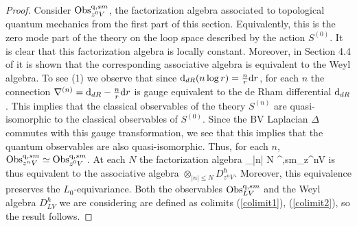 \documentclass[10pt]{amsart}
\begin{document}
\begin{proof}
Consider ${\rm Obs}_{z^0V}^{{\rm q}, sm}$, the factorization algebra associated to topological quantum mechanics from the first part of this section.
Equivalently, this is the zero mode part of the theory on the loop space described by the action $S^{(0)}$.
It is clear that this factorization algebra is locally constant. 
Moreover, in Section 4.4 of \cite{fact1} it is shown that the corresponding associative algebra is equivalent to the Weyl algebra.
To see (1) we observe that since ${\rm d}_{dR} (n \log r) = \frac{n}{r} {\rm d} r$, for each $n$ the connection $\nabla^{(n)} = {\rm d}_{dR} - \frac{n}{r} {\rm d} r$ is gauge equivalent to the de Rham differential ${\rm d}_{dR}$. 
This implies that the classical observables of the theory $S^{(n)}$ are quasi-isomorphic to the classical observables of $S^{(0)}$. 
Since the BV Laplacian $\Delta$ commutes with this gauge transformation, we see that this implies that the quantum observables are also quasi-isomorphic. 
Thus, for each $n$, ${\rm Obs}^{{\rm q},sm}_{z^n V} \simeq {\rm Obs}^{{\rm q},sm}_{z^0V}$.  
At each $N$ the factorization algebra 
\ben
\bigotimes_{|n| \leq N} \Obs^{\q,sm}_{z^nV}
\een
is thus equivalent to the associative algebra $\otimes_{|n|\leq N} D_{z^n V}^{\hbar}$.
Moreover, this equivalence preserves the $L_0$-equivariance. 
Both the observables ${\rm Obs}^{{\rm q},sm}_{LV}$ and the Weyl algebra $D_{LV}^\hbar$ we are considering are defined as colimits (\ref{colimit1}), (\ref{colimit2}), so the result follows. 


\end{proof}
\end{document}
